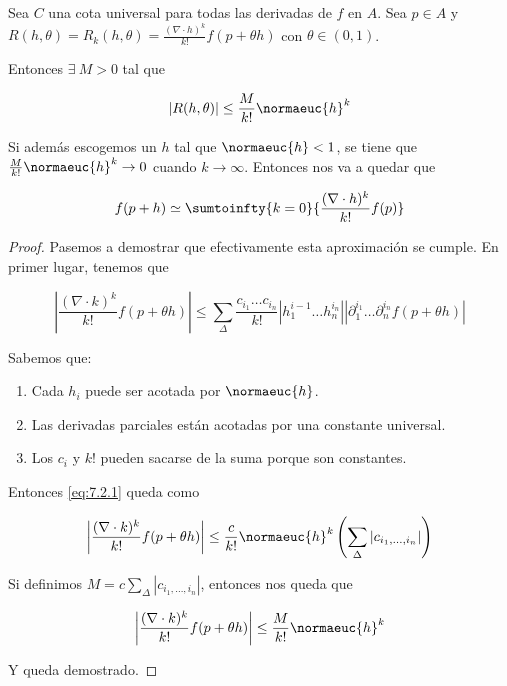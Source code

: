 \begin{pro}
    Sea $C$ una cota universal para todas las derivadas de $f$ en $A$. Sea $p \in A$ y $R(h, \theta) = R_k(h, \theta) = \frac{\left( \nabla \cdot h \right)^k}{k!}f(p+\theta h)$ con $\theta \in (0,1)$.
    
    Entonces $\exists~M > 0$ tal que
    
    \[
    \left| R(h, \theta) \right| \leq \frac{M}{k!}\normaeuc{h}^k
    \]
    
    Si además escogemos un $h$ tal que $\normaeuc{h} < 1$, se tiene que $\frac{M}{k!}\normaeuc{h}^k \to 0$ cuando $k \to \infty$. Entonces nos va a quedar que
    
    \[
    f(p + h) \simeq \sumtoinfty{k=0}{\dfrac{(\nabla \cdot h)^k}{k!}f(p)}
    \]
\end{pro}

\begin{proof}
    Pasemos a demostrar que efectivamente esta aproximación se cumple. En primer lugar, tenemos que
    
    \begin{equation}\label{eq:7.2.1}
        \left| \dfrac{(\nabla \cdot k)^k}{k!} f(p + \theta h) \right| \leq \sum_{\Delta} \dfrac{c_{i_1} \dots c_{i_n}}{k!} \left| h_1^{i-1} \dots h_n^{i_n} \right| \left| \partial_1^{i_1} \dots \partial_n^{i_n} f(p + \theta h) \right|
    \end{equation}
    
    Sabemos que:
    
    \begin{enumerate}
        \item Cada $h_i$ puede ser acotada por $\normaeuc{h}$.
        \item Las derivadas parciales están acotadas por una constante universal.
        \item Los $c_i$ y $k!$ pueden sacarse de la suma porque son constantes.
    \end{enumerate}
    
    Entonces \ref{eq:7.2.1} queda como
    
    \[
    \left| \dfrac{(\nabla \cdot k)^k}{k!} f(p + \theta h) \right| \leq \frac{c}{k!} \normaeuc{h}^k \left( \sum_{\Delta} | c_{i_1, \dots, i_n} | \right)
    \]
    
    Si definimos $M = c \sum_{\Delta} | c_{i_1, \dots, i_n} |$, entonces nos queda que
    
    \[
    \left| \dfrac{(\nabla \cdot k)^k}{k!} f(p + \theta h) \right| \leq \frac{M}{k!}\normaeuc{h}^k
    \]
    
    Y queda demostrado.
\end{proof}

